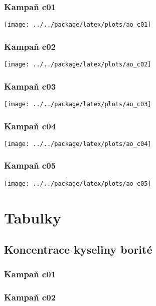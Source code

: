 \documentclass[a4paper,twoside,11pt]{article}
\begin{document}
\subsubsection{Kampaň c01}

\texttt{[image: ../../package/latex/plots/ao\_c01]}

\subsubsection{Kampaň c02}

\texttt{[image: ../../package/latex/plots/ao\_c02]}

\subsubsection{Kampaň c03}

\texttt{[image: ../../package/latex/plots/ao\_c03]}

\subsubsection{Kampaň c04}

\texttt{[image: ../../package/latex/plots/ao\_c04]}

\subsubsection{Kampaň c05}

\texttt{[image: ../../package/latex/plots/ao\_c05]}


\section{Tabulky}
\subsection{Koncentrace kyseliny borité}

\subsubsection{Kampaň c01}



\subsubsection{Kampaň c02}
\end{document}
